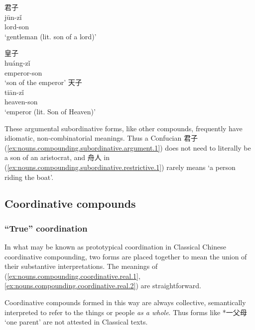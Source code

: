 \documentclass[UTF8, a4paper, oneside, scheme=plain, 12pt]{ctexrep}
\newcommand{\translate}[1]{`#1'}
\begin{document}
\begin{exe}
    \ex\label{ex:nouns.compounding.subordinative.argument.1}
    \glll 君子 \\
    jūn-zǐ \\
    lord-son \\
    \glt\translate{gentleman (lit. son of a lord)}
    \ex\label{ex:nouns.compounding.subordinative.argument.2} 
    \begin{xlist}
        \ex 
        \glll 皇子 \\ 
        huáng-zǐ \\ 
        emperor-son \\ 
        \glt\translate{son of the emperor}
        \ex 
        \glll 天子 \\ 
        tiān-zǐ \\ 
        heaven-son \\ 
        \glt\translate{emperor (lit. Son of Heaven)}
    \end{xlist}
\end{exe}

These argumental subordinative forms, like other compounds, frequently have idiomatic, non-combinatorial meanings.
Thus a Confucian 君子 (\ref{ex:nouns.compounding.subordinative.argument.1}) does not need to literally be a son of an aristocrat,
and 舟人 in (\ref{ex:nouns.compounding.subordinative.restrictive.1})
rarely means \translate{a person riding the boat}.


\subsection{Coordinative compounds}

\subsubsection{``True'' coordination}\label{sec:nouns.compounding.coordinative.real}

In what may be known as prototypical coordination in Classical Chinese coordinative compounding,
two forms are placed together to mean the union of their substantive interpretations.
The meanings of (\ref{ex:nouns.compounding.coordinative.real.1}, \ref{ex:nouns.compounding.coordinative.real.2}) are straightforward.

Coordinative compounds formed in this way are always collective,
semantically interpreted to refer to the things or people \emph{as a whole}. 
Thus forms like *一父母 \translate{one parent} are not attested in Classical texts.
\end{document}
